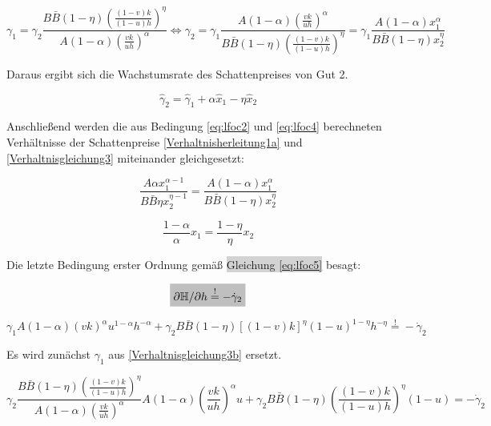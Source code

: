 	\begin{equation}
		\gamma_1=\gamma_2\frac{B\bar{B}(1-\eta)\left(\frac{(1-v)k}{(1-u)h}\right)^\eta}{A(1-\alpha)\left(\frac{vk}{uh}\right)^{\alpha}}\Longleftrightarrow \gamma_2=\gamma_1 \frac {A(1-\alpha)\left(\frac{vk}{uh}\right)^{\alpha}}{B\bar{B}(1-\eta)\left(\frac{(1-v)k}{(1-u)h}\right)^\eta} = \gamma_1 \frac {A(1-\alpha)x_1^{\alpha}}{B\bar{B}(1-\eta)x_2^\eta}\label{Verhaltnisgleichung3b}
	\end{equation}


Daraus ergibt sich die Wachstumsrate des Schattenpreises von Gut 2.

	
	\begin{equation}
		\hat{\gamma}_{2} = \hat{\gamma}_{1}+\alpha\hat{x}_1-\eta\hat{x}_2 \label{WachstumGamma2}
	\end{equation}


Anschlie{\ss}end werden die aus Bedingung \eqref{eq:lfoc2} und \eqref{eq:lfoc4} berechneten Verhältnisse der Schattenpreise \eqref{Verhaltnisherleitung1a} und \eqref{Verhaltnisgleichung3} miteinander gleichgesetzt: 


	\begin{equation}
		\frac{A\alpha x_1^{\alpha-1}}{B\bar{B}\eta x_2^{\eta-1}}=\frac{A(1-\alpha)x_1^{\alpha}}{B\bar{B}(1-\eta)x_2^\eta}
	\end{equation}


	\begin{equation}
		\boxed{\frac{1-\alpha}{\alpha}x_1=\frac{1-\eta}{\eta}x_2}
	\end{equation}


Die letzte Bedingung erster Ordnung gemä{\ss} \colorbox{lightgray}{Gleichung \eqref{eq:lfoc5}} besagt:


	\begin{equation*}
		\colorbox{lightgray}{$\partial\mathbb{H}/\partial h\overset{!}{=}-\dot{\gamma}_2$}
	\end{equation*}


	\begin{equation}
		\gamma_1A(1-\alpha)(vk)^\alpha u^{1-\alpha}h^{-\alpha}+\gamma_2 B\bar{B}(1-\eta)[(1-v)k]^{\eta}(1-u)^{1-\eta}h^{-\eta}\overset{!}{=}-\dot{\gamma}_2
	\end{equation}


Es wird zunächst $\gamma_1$ aus \eqref{Verhaltnisgleichung3b} ersetzt. 


	\begin{equation*}
		\gamma_2\frac{B\bar{B}(1-\eta)\left(\frac{(1-v)k}{(1-u)h}\right)^\eta}{A(1-\alpha)\left(\frac{vk}{uh}\right)^{\alpha}}A(1-\alpha)\left(\frac{vk}{uh}\right)^{\alpha}u+\gamma_2 B\bar{B}(1-\eta)\left(\frac{(1-v)k}{(1-u)h}\right)^\eta(1-u)=-\dot{\gamma}_2
	\end{equation*}


